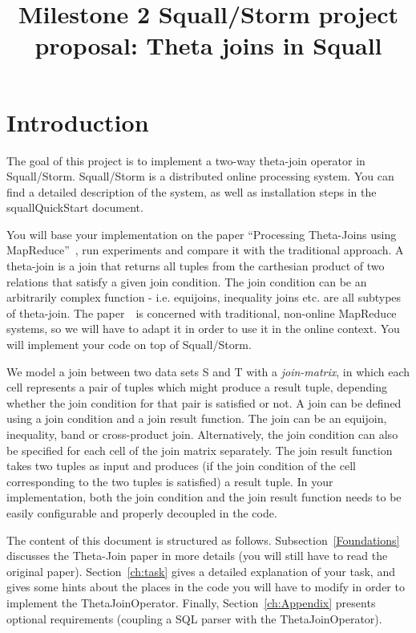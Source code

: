 \documentclass[a4paper,10pt]{article}
\begin{document}
\title{Milestone 2 Squall/Storm project proposal: Theta joins in Squall}
\date{}
\maketitle

\section{Introduction}
The goal of this project is to implement a two-way theta-join operator in Squall/Storm. Squall/Storm is a distributed online processing system. You can find a detailed description of the system, as well as installation steps in the squallQuickStart document.

You will base your implementation on the paper ``Processing Theta-Joins using MapReduce''~\cite{ThetaJoin}, run experiments and compare it with the traditional approach. A theta-join is a join that returns all tuples from the carthesian product of two relations that satisfy a given join condition. The join condition can be an arbitrarily complex function - i.e. equijoins, inequality joins etc. are all subtypes of theta-join. The paper~\cite{ThetaJoin}~is concerned with traditional, non-online MapReduce systems, so we will have to adapt it in order to use it in the online context. You will implement your code on top of Squall/Storm. %

We model a join between two data sets S and T with a \textit{join-matrix}, in which each cell represents a pair of tuples which might produce a result tuple, depending whether the join condition for that pair is satisfied or not. A join can be defined using a join condition and a join result function. The join can be an equijoin, inequality, band or cross-product join. Alternatively, the join condition can also be specified for each cell of the join matrix separately. The join result function takes two tuples as input and produces (if the join condition of the cell corresponding to the two tuples is satisfied) a result tuple. In your implementation, both the join condition and the join result function needs to be easily configurable and properly decoupled in the code.

The content of this document is structured as follows. Subsection~\ref{Foundations} discusses the Theta-Join paper in more details (you will still have to read the original paper). Section~\ref{ch:task} gives a detailed explanation of your task, and gives some hints about the places in the code you will have to modify in order to implement the ThetaJoinOperator. Finally, Section~\ref{ch:Appendix} presents optional requirements (coupling a SQL parser with the ThetaJoinOperator).
\end{document}
